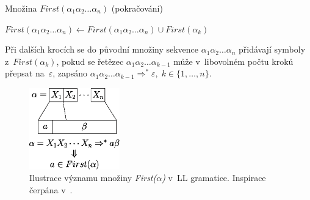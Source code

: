 \addtocounter{algorithm}{-1}
\begin{algorithm}[h]
    \caption{Množina $First(\alpha_1\alpha_2\ldots\alpha_n)$ (pokračování)}
    \begin{algorithmic}[1]
                \State $First(\alpha_1\alpha_2\ldots\alpha_n) \gets First(\alpha_1\alpha_2\ldots\alpha_n) \cup First(\alpha_k)$
            \EndIf
        \EndWhile
    \end{algorithmic}
\end{algorithm}

Při dalších krocích se do původní množiny sekvence $\alpha_1\alpha_2\ldots\alpha_n$ přidávají symboly z~$First(\alpha_k)$, pokud se řetězec $\alpha_1\alpha_2\ldots\alpha_{k-1}$ může v~libovolném počtu kroků přepsat na~$\varepsilon$, zapsáno $\alpha_1\alpha_2\ldots\alpha_{k-1} \Rightarrow^* \varepsilon,\; k \in \{1,\ldots,n\}$.

\begin{figure}[h!]
    \centering
    \includegraphics[width=0.35\textwidth]{obrazky-figures/first.eps}
    \caption{Ilustrace významu množiny \emph{First($\alpha$)} v~LL gramatice. Inspirace čerpána v~\cite{meduna2017sa-shora-dolu}.}
    \label{fig_mnozina_first}
\end{figure}

